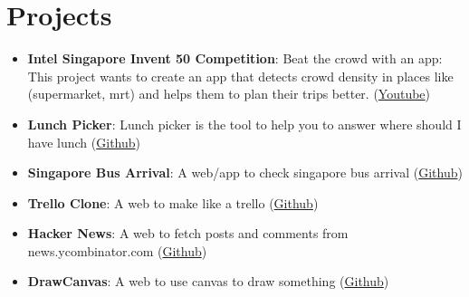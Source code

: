 \documentclass[letterpaper,11pt]{article}
\newcommand{\resumeItem}[2]{
  \item\small{
    \textbf{#1}{: #2 \vspace{-2pt}}
  }
}
\newcommand{\resumeSubItem}[2]{\resumeItem{#1}{#2}\vspace{-4pt}}
\newcommand{\resumeSubHeadingListStart}{\begin{itemize}[leftmargin=*]}
\newcommand{\resumeSubHeadingListEnd}{\end{itemize}}
\begin{document}
\section{Projects}
  \resumeSubHeadingListStart
    \resumeSubItem{Intel Singapore Invent 50 Competition}
      {Beat the crowd with an app: This project wants to create an app that detects crowd density in places like (supermarket, mrt) and helps them to plan their trips better. (\href{https://www.youtube.com/watch?v=0AEbxRXz-tM&ab_channel=HardwareZoneSG}{Youtube})}
    \resumeSubItem{Lunch Picker}
      {Lunch picker is the tool to help you to answer where should I have lunch (\href{https://github.com/yeukfei02}{Github})}
    \resumeSubItem{Singapore Bus Arrival}
      {A web/app to check singapore bus arrival (\href{https://github.com/yeukfei02}{Github})}
    \resumeSubItem{Trello Clone}
      {A web to make like a trello (\href{https://github.com/yeukfei02}{Github})}
    \resumeSubItem{Hacker News}
      {A web to fetch posts and comments from news.ycombinator.com (\href{https://github.com/yeukfei02}{Github})}
    \resumeSubItem{DrawCanvas}
      {A web to use canvas to draw something (\href{https://github.com/yeukfei02}{Github})}
  \resumeSubHeadingListEnd


\end{document}
